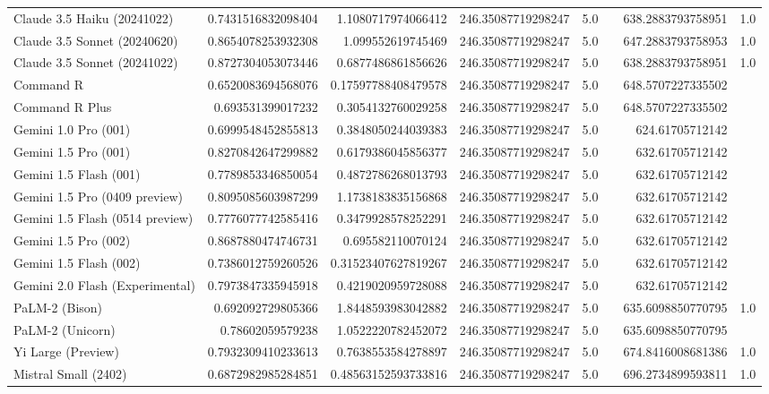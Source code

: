\begin{table}[htp]
{\begin{tabular}{lrrrrrrr}
Claude 3.5 Haiku (20241022) & 0.7431516832098404 & 1.1080717974066412 & 246.35087719298247 & 5.0 &  & 638.2883793758951 & 1.0 \\
Claude 3.5 Sonnet (20240620) & 0.8654078253932308 & 1.099552619745469 & 246.35087719298247 & 5.0 &  & 647.2883793758953 & 1.0 \\
Claude 3.5 Sonnet (20241022) & 0.8727304053073446 & 0.6877486861856626 & 246.35087719298247 & 5.0 &  & 638.2883793758951 & 1.0 \\
Command R & 0.6520083694568076 & 0.17597788408479578 & 246.35087719298247 & 5.0 &  & 648.5707227335502 &  \\
Command R Plus & 0.693531399017232 & 0.3054132760029258 & 246.35087719298247 & 5.0 &  & 648.5707227335502 &  \\
Gemini 1.0 Pro (001) & 0.6999548452855813 & 0.3848050244039383 & 246.35087719298247 & 5.0 &  & 624.61705712142 &  \\
Gemini 1.5 Pro (001) & 0.8270842647299882 & 0.6179386045856377 & 246.35087719298247 & 5.0 &  & 632.61705712142 &  \\
Gemini 1.5 Flash (001) & 0.7789853346850054 & 0.4872786268013793 & 246.35087719298247 & 5.0 &  & 632.61705712142 &  \\
Gemini 1.5 Pro (0409 preview) & 0.8095085603987299 & 1.1738183835156868 & 246.35087719298247 & 5.0 &  & 632.61705712142 &  \\
Gemini 1.5 Flash (0514 preview) & 0.7776077742585416 & 0.3479928578252291 & 246.35087719298247 & 5.0 &  & 632.61705712142 &  \\
Gemini 1.5 Pro (002) & 0.8687880474746731 & 0.695582110070124 & 246.35087719298247 & 5.0 &  & 632.61705712142 &  \\
Gemini 1.5 Flash (002) & 0.7386012759260526 & 0.31523407627819267 & 246.35087719298247 & 5.0 &  & 632.61705712142 &  \\
Gemini 2.0 Flash (Experimental) & 0.7973847335945918 & 0.4219020959728088 & 246.35087719298247 & 5.0 &  & 632.61705712142 &  \\
PaLM-2 (Bison) & 0.692092729805366 & 1.8448593983042882 & 246.35087719298247 & 5.0 &  & 635.6098850770795 & 1.0 \\
PaLM-2 (Unicorn) & 0.78602059579238 & 1.0522220782452072 & 246.35087719298247 & 5.0 &  & 635.6098850770795 &  \\
Yi Large (Preview) & 0.7932309410233613 & 0.7638553584278897 & 246.35087719298247 & 5.0 &  & 674.8416008681386 & 1.0 \\
Mistral Small (2402) & 0.6872982985284851 & 0.48563152593733816 & 246.35087719298247 & 5.0 &  & 696.2734899593811 & 1.0 \\

\end{tabular}}
\end{table}

